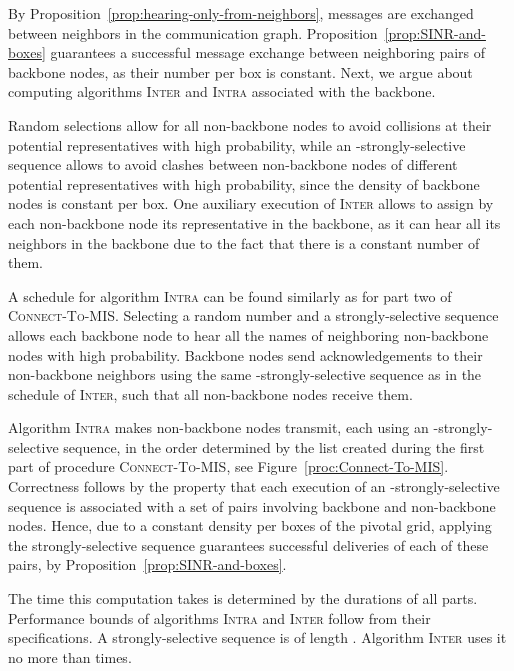 \documentclass[11pt]{article}
\newcommand{\qed}{\hfill  \smallskip}
\newenvironment{proof}{\noindent{\bf Proof:}}{\qed}
\begin{document}
\begin{proof}
By Proposition~\ref{prop:hearing-only-from-neighbors}, messages are exchanged between neighbors in the communication graph.
Proposition~\ref{prop:SINR-and-boxes} guarantees a successful message exchange between neighboring pairs of  backbone nodes, as their number per box is constant.
Next, we argue about computing algorithms \textsc{Inter} and \textsc{Intra} associated with the backbone.

Random selections allow for all non-backbone nodes to avoid collisions at their potential representatives with high probability, while an -strongly-selective sequence  allows to avoid clashes between  non-backbone nodes of different potential representatives with high probability, since the density of backbone nodes is constant per box.
One auxiliary execution of \textsc{Inter} allows to assign by each non-backbone node its representative in the backbone, as it can hear all its neighbors in the backbone due to the fact that there is a constant number of them.

A  schedule for algorithm \textsc{Intra} can be found similarly as for part two of \textsc{Connect-To-MIS}. 
Selecting a random number and a strongly-selective sequence allows each backbone node to hear all the names of neighboring non-backbone nodes with high probability. 
Backbone nodes send acknowledgements to their non-backbone neighbors using the same -strongly-selective sequence as in the schedule of \textsc{Inter}, such that all non-backbone nodes receive them.


Algorithm \textsc{Intra} makes non-backbone nodes transmit, each using an -strongly-selective sequence, in the order determined by the list  created during the first part of procedure \textsc{Connect-To-MIS}, see Figure~\ref{proc:Connect-To-MIS}.
Correctness follows by the property that each execution of an -strongly-selective sequence is associated with a set of pairs involving backbone and non-backbone nodes.
Hence, due to a constant density per boxes of the pivotal grid, applying the strongly-selective sequence guarantees successful deliveries of each of these pairs, by  Proposition~\ref{prop:SINR-and-boxes}.


The time this computation takes is determined by the durations of all parts.
Performance bounds of algorithms \textsc{Intra} and \textsc{Inter} follow  from their specifications.
A strongly-selective sequence is of length .
Algorithm \textsc{Inter} uses it no more than  times.
\end{proof}
\end{document}
